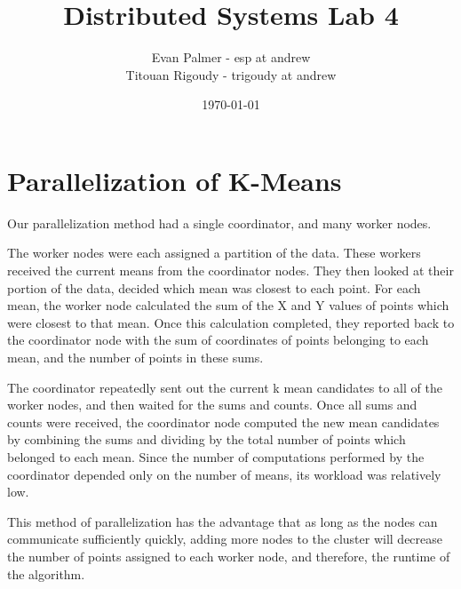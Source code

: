 \documentclass[12pt]{article}
\title{Distributed Systems Lab 4}
\author{
    Evan Palmer - esp at andrew\\
    Titouan Rigoudy - trigoudy at andrew
}
\date{\today}
\begin{document}
\maketitle

\section{Parallelization of K-Means}

Our parallelization method had a single coordinator, and many worker nodes.


The worker nodes were each assigned a partition of the data. These workers received the current means from the coordinator nodes. They then looked at their portion of the data, decided which mean was closest to each point. For each mean, the worker node calculated the sum of the X and Y values of points which were closest to that mean. Once this calculation completed, they reported back to the coordinator node with the sum of coordinates of points belonging to each mean, and the number of points in these sums.


The coordinator repeatedly sent out the current k mean candidates to all of the worker nodes, and then waited for the sums and counts. Once all sums and counts were received, the coordinator node computed the new mean candidates by combining the sums and dividing by the total number of points which belonged to each mean. Since the number of computations performed by the coordinator depended only on the number of means, its workload was relatively low.


This method of parallelization has the advantage that as long as the nodes can communicate sufficiently quickly, adding more nodes to the cluster will decrease the number of points assigned to each worker node, and therefore, the runtime of the algorithm.

\newpage
\end{document}

